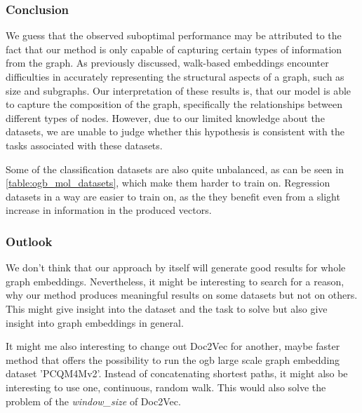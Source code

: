\subsubsection{Conclusion}
We guess that the observed suboptimal performance may be attributed to the fact that our method is only capable of capturing certain types of information from the graph. As previously discussed, walk-based embeddings encounter difficulties in accurately representing the structural aspects of a graph, such as size and subgraphs. Our interpretation of these results is, that our model is able to capture the composition of the graph, specifically the relationships between different types of nodes. However, due to our limited knowledge about the datasets, we are unable to judge whether this hypothesis is consistent with the tasks associated with these datasets.

Some of the classification datasets are also quite unbalanced, as can be seen in \autoref{table:ogb_mol_datasets}, which make them harder to train on. Regression datasets in a way are easier to train on, as the they benefit even from a slight increase in information in the produced vectors.

\subsubsection{Outlook}
We don't think that our approach by itself will generate good results for whole graph embeddings. Nevertheless, it might be interesting to search for a reason, why our method produces meaningful results on some datasets but not on others. This might give insight into the dataset and the task to solve but also give insight into graph embeddings in general.

It might me also interesting to change out Doc2Vec for another, maybe faster method that offers the possibility to run the ogb large scale graph embedding dataset 'PCQM4Mv2'. Instead of concatenating shortest paths, it might also be interesting to use one, continuous, random walk. This would also solve the problem of the \emph{window\_size} of Doc2Vec.

